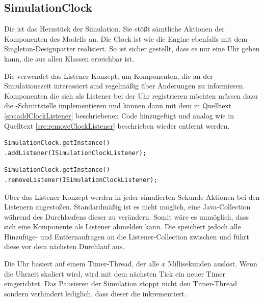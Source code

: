 \subsection{SimulationClock}
Die  ist das Herzstück der Simulation. Sie stößt sämtliche Aktionen der Komponenten des Modells an. Die Clock ist wie die Engine ebenfalls mit dem Singleton-Designpatter realisiert. So ist sicher gestellt, dass es nur eine Uhr geben kann, die aus allen Klassen erreichbar ist.

Die  verwendet das Listener-Konzept, um Komponenten, die an der Simulationszeit interessiert sind regelmäßig über Änderungen zu informieren. Komponenten die sich als Listener bei der Uhr registrieren möchten müssen dazu die -Schnitt\-stel\-le implementieren und können dann mit dem in Quelltext \ref{src:addClockListener} beschriebenen Code hinzugefügt und analog wie in Quelltext \ref{src:removeClockListener} beschrieben wieder entfernt werden.

\begin{illfloat}
  \begin{lstlisting}
SimulationClock.getInstance()
.addListener(ISimulationClockListener);
  \end{lstlisting}
\label{src:addClockListener}
\end{illfloat}
\begin{illfloat}
\begin{lstlisting}
SimulationClock.getInstance()
.removeListener(ISimulationClockListener);
\end{lstlisting}
\label{src:removeClockListener}
\end{illfloat}

Über das Listener-Konzept werden in jeder simulierten Sekunde Aktionen bei den Listenern angestoßen. Standardmäßig ist es nicht möglich, eine Java-Collection während des Durchlaufens dieser zu verändern. Somit wäre es unmöglich, dass sich eine Komponente als Listener abmelden kann. Die  speichert jedoch alle Hinzufüge- und Entfernanfragen an die Listener-Collection zwischen und führt diese vor dem nächsten Durchlauf aus.

Die Uhr basiert auf einem Timer-Thread, der alle $x$ Millisekunden auslöst. Wenn die Uhrzeit skaliert wird, wird mit dem nächsten Tick ein neuer Timer eingerichtet. Das Pausieren der Simulation stoppt nicht den Timer-Thread sondern verhindert lediglich, dass dieser die  inkrementiert.


